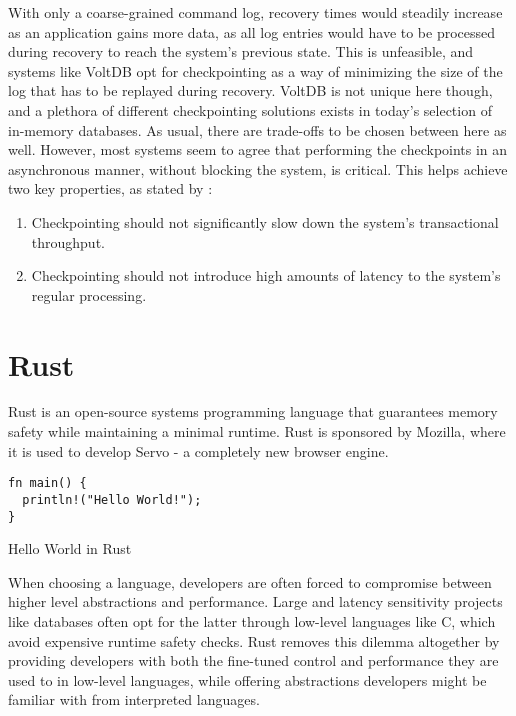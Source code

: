\documentclass[b5paper]{report}
\begin{document}
With only a coarse-grained command log, recovery times would steadily increase
as an application gains more data, as all log entries would have to be processed
during recovery to reach the system's previous state. This is unfeasible, and
systems like VoltDB opt for checkpointing as a way of minimizing the size of the
log that has to be replayed during recovery. VoltDB is not unique here though,
and a plethora of different checkpointing solutions exists in today's selection
of in-memory databases. As usual, there are trade-offs to be chosen between here
as well. However, most systems seem to agree that performing the checkpoints in an
asynchronous manner, without blocking the system, is critical. This helps
achieve two key properties, as stated by \cite{memory-checkpoint}:

\begin{enumerate}
  \item Checkpointing should not significantly slow down the system's
    transactional throughput.
  \item Checkpointing should not introduce high amounts of latency to the
    system's regular processing.
\end{enumerate}

\section{Rust}
Rust \cite{rust} is an open-source systems programming language that guarantees memory
safety while maintaining a minimal runtime. Rust is sponsored by Mozilla, where
it is used to develop Servo - a completely new browser engine.

\begin{listing}[H]
  \begin{verbatim}
fn main() {
  println!("Hello World!");
}
  \end{verbatim}
  \caption{Hello World in Rust}
\end{listing}

When choosing a language, developers are often forced to compromise between
higher level abstractions and performance. Large and latency sensitivity projects
like databases often opt for the latter through low-level languages like C,
which avoid expensive runtime safety checks. Rust removes this dilemma
altogether by providing developers with both the fine-tuned control and
performance they are used to in low-level languages, while offering abstractions
developers might be familiar with from interpreted languages.
\end{document}
